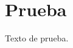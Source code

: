 \documentclass[12pt,oneside]{book}
\begin{document}
\frontmatter
\tableofcontents
\mainmatter
\chapter{Prueba}
Texto de prueba.
\end{document}
